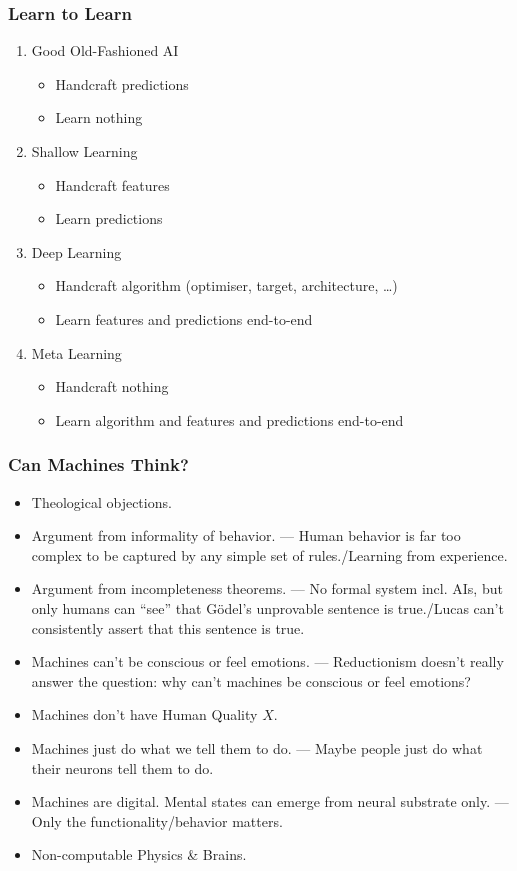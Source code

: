 \documentclass[UTF8,11pt,colorlinks,compress,openany]{beamer}%
\begin{document}
\begin{frame}\frametitle{Learn to Learn}
\begin{enumerate}
	\item Good Old-Fashioned AI
		\begin{itemize}
			\item Handcraft predictions
			\item Learn nothing
		\end{itemize}
	\item Shallow Learning
		\begin{itemize}
			\item Handcraft features
			\item Learn predictions
		\end{itemize}
	\item Deep Learning
		\begin{itemize}
			\item Handcraft algorithm (optimiser, target, architecture, \dots)
			\item Learn features and predictions end-to-end
			\end{itemize}
	\item Meta Learning
		\begin{itemize}
			\item Handcraft nothing
			\item Learn algorithm and features and predictions end-to-end
		\end{itemize}
\end{enumerate}
\end{frame}

\begin{frame}\frametitle{Can Machines Think?}
\begin{itemize}
	\item Theological objections.
	\item Argument from informality of behavior. --- Human behavior is far too complex to be captured by any simple set of rules./Learning from experience.
	\item Argument from incompleteness theorems. --- No formal system incl. AIs, but only humans can ``see'' that G\"odel's unprovable sentence is true./Lucas can't consistently assert that this sentence is true.
	\item Machines can't be conscious or feel emotions. --- Reductionism doesn't really answer the question: why can't machines be conscious or feel emotions?
	\item Machines don't have Human Quality $X$.
	\item Machines just do what we tell them to do. --- Maybe people just do what their neurons tell them to do.
	\item Machines are digital. Mental states can emerge from neural substrate only. --- Only the functionality/behavior matters.
	\item Non-computable Physics \& Brains.
\end{itemize}
\end{frame}
\end{document}
